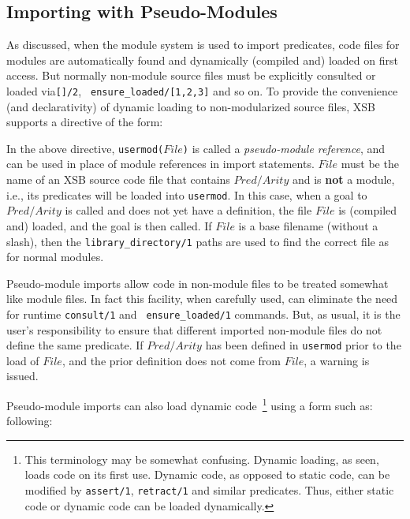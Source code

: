 \subsection{Importing with Pseudo-Modules}

As discussed, when the module system is used to import predicates,
code files for modules are automatically found and dynamically
(compiled and) loaded on first access.  But normally non-module source
files must be explicitly consulted or loaded via{\tt []/2}, {\tt
  ensure\_loaded/[1,2,3]} and so on.  To provide the convenience (and
declarativity) of dynamic loading to non-modularized source files, XSB
supports a directive of the form:


\noindent 
In the above directive, {\tt usermod($File$)} is called a {\em
  pseudo-module reference}, and can be used in place of module
references in import statements.  $File$ must be the name of an XSB
source code file that contains $Pred/Arity$ and is {\bf not} a module,
i.e., its predicates will be loaded into {\tt usermod}.  In this case,
when a goal to $Pred/Arity$ is called and does not yet have a
definition, the file $File$ is (compiled and) loaded, and the goal is
then called.  If $File$ is a base filename (without a slash), then the
{\tt library\_directory/1} paths are used to find the correct file as
for normal modules.


Pseudo-module imports allow code in non-module files to be treated
somewhat like module files.  In fact this facility, when carefully
used, can eliminate the need for runtime {\tt consult/1} and {\tt
  ensure\_loaded/1} commands.  But, as usual, it is the user's
responsibility to ensure that different imported non-module files do
not define the same predicate.  If $Pred/Arity$ has been defined in
{\tt usermod} prior to the load of $File$, and the prior definition
does not come from $File$, a warning is issued.

Pseudo-module imports can also load dynamic code~\footnote{This
  terminology may be somewhat confusing.  Dynamic loading, as seen,
  loads code on its first use.  Dynamic code, as opposed to static
  code, can be modified by {\tt assert/1}, {\tt retract/1} and similar
  predicates.  Thus, either static code or dynamic code can be loaded
  dynamically.}  using a form such as: following:

